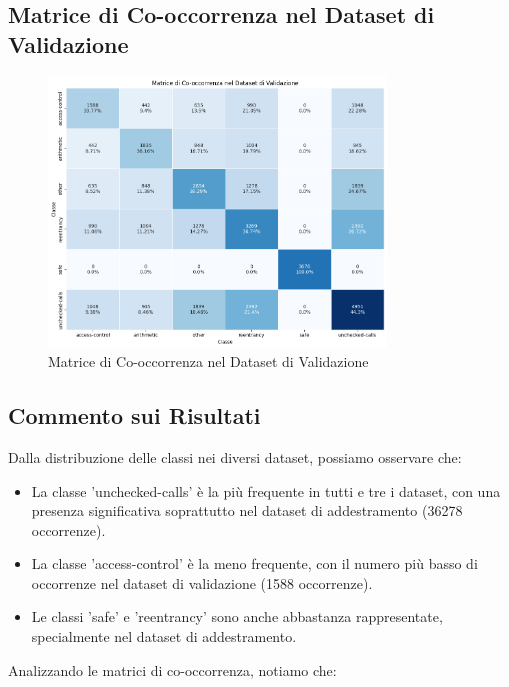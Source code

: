 \documentclass[../../Thesis.tex]{subfiles}
\begin{document}
\subsection{Matrice di Co-occorrenza nel Dataset di Validazione}
\begin{figure}[H]
    \centering
    \includegraphics[width=0.8\textwidth]{../../img/ValCo-occurrency.png}
    \caption{Matrice di Co-occorrenza nel Dataset di Validazione}
    \label{fig:val_cooccurrence_matrix}
\end{figure}

\subsection{Commento sui Risultati}

Dalla distribuzione delle classi nei diversi dataset, possiamo osservare che:

\begin{itemize}
    \item La classe 'unchecked-calls' è la più frequente in tutti e tre i dataset, con una presenza significativa soprattutto nel dataset di addestramento (36278 occorrenze).
    \item La classe 'access-control' è la meno frequente, con il numero più basso di occorrenze nel dataset di validazione (1588 occorrenze).
    \item Le classi 'safe' e 'reentrancy' sono anche abbastanza rappresentate, specialmente nel dataset di addestramento.
\end{itemize}

Analizzando le matrici di co-occorrenza, notiamo che:
\end{document}
